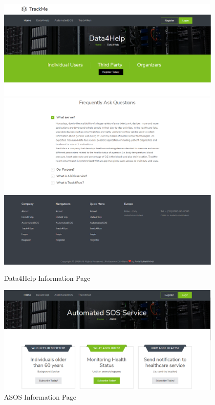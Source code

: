 \documentclass[a4paper, hidelinks, 12pt]{report}
\begin{document}
	\begin{figure}[H]
		\centering
		\includegraphics[scale=0.4]{UI/d4h.png}
		\includegraphics[scale=0.4]{UI/d4h2.png}
		\includegraphics[scale=0.35]{UI/d4h_home4.png}

		\caption[UI: Data4Help Information Page]{Data4Help Information Page}
		\label{fig:Data4Help Information Page}
	\end{figure}
	\begin{figure}[H]
		\centering
		\includegraphics[scale=0.4]{UI/asos.png}

		\caption[UI: ASOS Information Page]{ASOS Information Page}
		\label{fig:ASOS Information Page}
	\end{figure}
	
\end{document}
